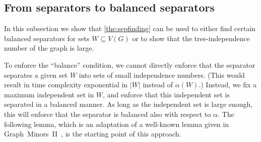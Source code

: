 \documentclass[11pt]{article}
\theoremstyle{definition}
\begin{document}
\subsection{From separators to balanced separators}
In this subsection we show that \cref{the:sepfinding} can be used to either find certain balanced separators for sets $W \subseteq V(G)$ or to show that the tree-independence number of the graph is large.


To enforce the ``balance'' condition, we cannot directly enforce that the separator separates a given set $W$ into sets of small independence numbers.  (This would result in time complexity exponential in $|W|$ instead of $\alpha(W)$.)
Instead, we  fix a maximum independent set in $W$, and enforce that this independent set is separated in a balanced manner.
As long as the independent set is large enough, this will enforce that the separator is balanced also with respect to $\alpha$.
The following lemma, which is an adaptation of a well-known lemma given in Graph~Minors~II~\cite{DBLP:journals/jal/RobertsonS86}, is the starting point of this approach.
\end{document}
